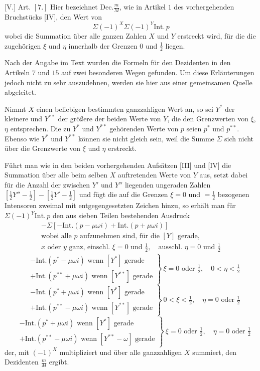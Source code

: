 [V.] Art. $[7.]$ Hier bezeichnet $\mathrm{Dec.}\frac mM$, wie in Artikel $1$ des vorhergehenden Bruchstücks [IV], den Wert von
\[
\Sigma(-1)^X\Sigma(-1)^Y\mathrm{Int.}\,p
\]
wobei die Summation über alle ganzen Zahlen $X$ und $Y$ erstreckt wird, für die die zugehörigen $\xi$ und $\eta$ innerhalb der Grenzen $0$ und $\tfrac12$ liegen.

Nach der Angabe im Text wurden die Formeln für den Dezidenten in den Artikeln $7$ und $15$ auf zwei besonderen
Wegen gefunden. Um diese Erläuterungen jedoch nicht zu sehr auszudehnen, werden sie hier aus einer gemeinsamen Quelle abgeleitet.

Nimmt $X$ einen beliebigen bestimmten ganzzahligen Wert an, so sei $Y^{*}$ der kleinere und $Y^{**}$ der größere der beiden Werte von $Y$, die den Grenzwerten von $\xi$, $\eta$ entsprechen. Die zu $Y^{*}$ und $Y^{**}$ gehörenden Werte von $p$ seien $p^{*}$ und $p^{**}$. Ebenso wie $Y^{*}$ und $Y^{**}$ können sie nicht gleich sein, weil die Summe $\Sigma$ sich nicht über die Grenzwerte von $\xi$ und $\eta$ erstreckt.

Führt man wie in den beiden vorhergehenden Aufsätzen [III] und [IV] die Summation über alle beim selben $X$ auftretenden Werte von $Y$ aus, setzt dabei für die Anzahl der zwischen $Y'$ und $Y''$ liegenden ungeraden Zahlen $[\tfrac12Y''-\tfrac12]-[\tfrac12Y'-\tfrac12]$ und fügt die auf die Grenzen $\xi=0$ und $=\tfrac12$ bezogenen Intensoren zweimal mit entgegengesetzten Zeichen hinzu, so erhält man für $\Sigma(-1)^Y\mathrm{Int.}\,p$ den aus sieben Teilen bestehenden Ausdruck
\[
\begin{gathered}
-\Sigma[-\mathrm{Int.}(p-\mu\omega i)+\mathrm{Int.}(p+\mu\omega i)]\\
\text{wobei alle }p\text{ aufzunehmen sind, für die }[Y]\text{ gerade,}\\
x\text{ oder }y\text{ ganz, einschl. }\xi=0\text{ und }\tfrac12,\quad
\text{ausschl. }\eta=0\text{ und }\tfrac12
\end{gathered}
\]
\[
\left.\begin{aligned}
&-\mathrm{Int.}(p^{*}-\mu\omega i)\text{ wenn }[Y^{*}]\text{ gerade}\\
&+\mathrm{Int.}(p^{**}+\mu\omega i)\text{ wenn }[Y^{**}]\text{ gerade}
\end{aligned}\right\}\ \xi=0\text{ oder }\tfrac12,\quad0<\eta<\tfrac12
\]
\[
\left.\begin{aligned}
&-\mathrm{Int.}(p^{*}+\mu\omega i)\text{ wenn }[Y^{*}]\text{ gerade}\\
&+\mathrm{Int.}(p^{**}-\mu\omega i)\text{ wenn }[Y^{**}]\text{ gerade}
\end{aligned}\right\}\ 0<\xi<\tfrac12,\quad\eta=0\text{ oder }\tfrac12
\]
\[
\left.\begin{aligned}
&-\mathrm{Int.}(p^{*}+\mu\omega i)\text{ wenn }[Y^{*}]\text{ gerade}\\
&+\mathrm{Int.}(p^{**}-\mu\omega i)\text{ wenn }[Y^{**}-\omega]\text{ gerade}
\end{aligned}\right\}\ \xi=0\text{ oder }\tfrac12,\quad\eta=0\text{ oder }\tfrac12
\]
der, mit $(-1)^X$ multipliziert und über alle ganzzahligen $X$ summiert, den Dezidenten $\frac mM$ ergibt.


